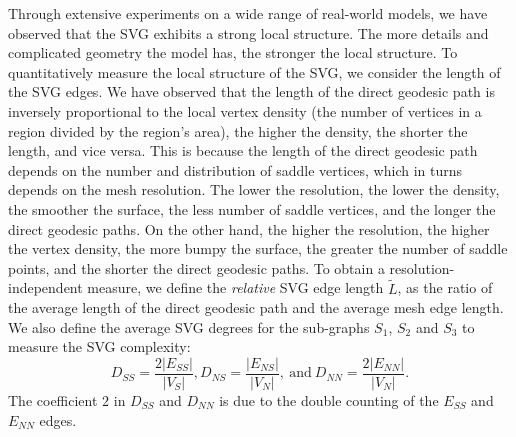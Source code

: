 Through extensive experiments on a wide range of real-world models,
we have observed that the SVG exhibits a strong local structure. The
more details and complicated geometry the model has, the stronger
the local structure. To quantitatively measure the local structure
of the SVG, we consider the length of the SVG edges. We have
observed that the length of the direct geodesic path is inversely
proportional to the local vertex density (the number of vertices in
a region divided by the region's area), the higher the density, the
shorter the length, and vice versa. This is because the length of
the direct geodesic path depends on the number and distribution of
saddle vertices, which in turns depends on the mesh resolution. The
lower the resolution, the lower the density, the smoother the
surface, the less number of saddle vertices, and the longer the
direct geodesic paths. On the other hand, the higher the resolution,
the higher the vertex density, the more bumpy the surface, the
greater the number of saddle points, and the shorter the direct
geodesic paths. To obtain a resolution-independent measure, we
define the \textit{relative} SVG edge length $\widetilde{L}$, as the
ratio of the average length of the direct geodesic path and the
average mesh edge length. We also define the average SVG degrees for
the sub-graphs $S_1$, $S_2$ and $S_3$ to measure the SVG complexity:
\begin{displaymath}
D_{SS}=\frac{2|E_{SS}|}{|V_S|}, D_{NS}=\frac{|E_{NS}|}{|V_N|},
~\mathrm{and}~ D_{NN}=\frac{2|E_{NN}|}{|V_N|}.
\end{displaymath}
The coefficient $2$ in $D_{SS}$ and $D_{NN}$ is due to the double
counting of the $E_{SS}$ and $E_{NN}$ edges.


